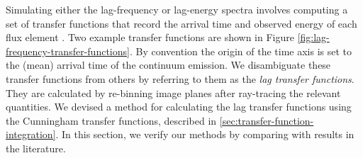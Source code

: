 \documentclass[fleqn,usenatbib]{mnras}
\begin{document}
Simulating either the lag-frequency or lag-energy spectra involves computing a
set of transfer functions that record the arrival time and observed energy of
each flux element \citep{reynolds_x-ray_1999}. Two example transfer functions are shown in Figure
\ref{fig:lag-frequency-transfer-functions}. By convention the
origin of the time axis is set to the (mean) arrival time of the continuum
emission. We disambiguate these transfer functions from others by referring to
them as the \textit{lag transfer functions}. They are calculated by re-binning
image planes after ray-tracing the relevant quantities. We devised a method for
calculating the lag transfer functions using the Cunningham transfer functions,
described in \ref{sec:transfer-function-integration}. In this section, we verify
our methods by comparing with results in the literature.


\end{document}
